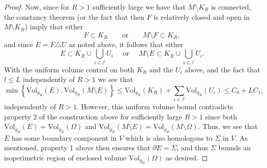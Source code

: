 \documentclass[12pt]{article}
\begin{document}
\begin{proof}
    Now, since for $R > 1$ sufficiently large we have that $M \setminus K_R$ is connected, the constancy theorem (or the fact that then $F$ is relatively closed and open in $M \setminus K_R$) imply that either 
    $$
    F\subset K_R
    \qquad\text{or}\qquad
    M\setminus F\subset K_R,
    $$
    and since $E=F\triangle U$ as noted above, it follows that either
    $$
    E\subset K_R \cup\bigcup_{i\in\mathcal I}U_i
    \quad  \text{ or } \quad
    M\setminus E\subset K_R \cup\bigcup_{i\in\mathcal I}U_i.
    $$
    With the uniform volume control on both $K_R$ and the $U_i$ above, and the fact that $l \leq L$ independently of $R > 1$ we see that
    $$
    \min\left\{ \mathrm{Vol}_{g_R}(E), \mathrm{Vol}_{g_R}(M\setminus E) \right\} \leq \mathrm{Vol}_{g_R}(K_R) + \sum_{i\in\mathcal I}\mathrm{Vol}_{g_R}(U_i) \leq C_0+LC_1,
    $$ 
    independently of $R > 1$. However, this uniform volume bound contradicts property 2 of the construction above for sufficiently large $R > 1$ since both $\mathrm{Vol}_{g_R}(E) = \mathrm{Vol}_{g_R}(\Omega)$ and $\mathrm{Vol}_{g_R}(M \setminus E) = \mathrm{Vol}_{g_R}(M \setminus \Omega)$. Thus, we see that $E$ has some boundary component in $V$ which is also homologous to $\Sigma$ in $V$. As mentioned, property 1 above then ensures that $\partial E = \Sigma$, and thus $\Sigma$ bounds an isoperimetric region of enclosed volume $\mathrm{Vol}_{g_R}(\Omega)$ as desired.

\end{proof}
\end{document}
